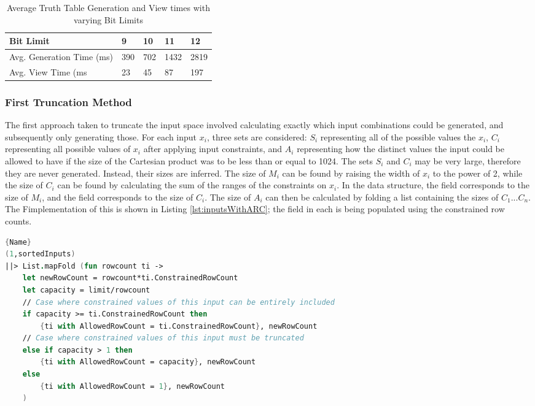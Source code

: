 \begin{table}[!ht]
    \centering
    \begin{tabular}{|l|l|l|l|l|}
    \hline
        Bit Limit & 9 & 10 & 11 & 12 \\ \hline
        Avg. Generation Time (ms) & 390 & 702 & 1432 & 2819 \\ \hline
        Avg. View Time (ms & 23 & 45 & 87 & 197 \\ \hline
    \end{tabular}
    \caption{Average Truth Table Generation and View times with varying Bit Limits}
    \label{tab:bitlimit}
\end{table}

\subsubsection{First Truncation Method}
The first approach taken to truncate the input space involved calculating exactly which input combinations could be generated, and subsequently only generating those. For each input $x_i$, three sets are considered: $S_i$ representing all of the possible values the $x_i$, $C_i$ representing all possible values of $x_i$ after applying input constraints, and $A_i$ representing how the distinct values the input could be allowed to have if the size of the Cartesian product was to be less than or equal to 1024. The sets $S_i$ and $C_i$ may be very large, therefore they are never generated. Instead, their sizes are inferred. The size of $M_i$ can be found by raising the width of $x_i$ to the power of 2, while the size of $C_i$ can be found by calculating the sum of the ranges of the constraints on $x_i$. In the  data structure, the  field corresponds to the size of $M_i$, and the  field corresponds to the size of $C_i$.
The size of $A_i$ can then be calculated by folding a list containing the sizes of $C_1...C_n$. The F\fsharp implementation of this is shown in Listing \ref{lst:inputsWithARC}; the  field in each  is being populated using the constrained row counts.
\begin{lstlisting}[caption=Calculating Allowed Row Counts,frame=tlrb, language=FSharp, label=lst:inputsWithARC]{Name}
(1,sortedInputs)
||> List.mapFold (fun rowcount ti ->
    let newRowCount = rowcount*ti.ConstrainedRowCount
    let capacity = limit/rowcount
    // Case where constrained values of this input can be entirely included
    if capacity >= ti.ConstrainedRowCount then
        {ti with AllowedRowCount = ti.ConstrainedRowCount}, newRowCount
    // Case where constrained values of this input must be truncated
    else if capacity > 1 then
        {ti with AllowedRowCount = capacity}, newRowCount
    else
        {ti with AllowedRowCount = 1}, newRowCount
    )

\end{lstlisting}

